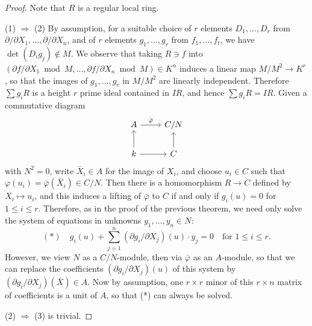 \begin{proof}
Note that $R$ is a regular local ring.

(1) $\Rightarrow$ (2) By assumption, for a suitable choice of $r$ elements
$D_1, \ldots, D_r$ from $\partial/\partial X_1, \ldots, \partial/\partial X_n$, and of $r$ elements
$g_1, \ldots, g_r$ from $f_1, \ldots, f_t$, we have $\det(D_ig_j) \notin M$. We observe that
taking $R \ni f$ into $(\partial f/\partial X_1 \bmod M, \ldots, \partial f/\partial X_n \bmod M)
\in K^n$ induces a linear map $M/M^2 \to K^r$, so that the images of $g_1, \ldots, g_r$ in
$M/M^2$ are linearly independent. Therefore $\sum g_iR$ is a height $r$ prime ideal
contained in $IR$, and hence $\sum g_iR = IR$. Given a commutative diagram
\[
\begin{tikzcd}
A \arrow[r, "\bar{\varphi}"] & C/N \\
k \arrow[u] \arrow[r] & C \arrow[u]
\end{tikzcd}
\]
with $N^2 = 0$, write $\bar{X}_i \in A$ for the image of $X_i$, and choose $u_i \in C$
such that $\varphi(u_i) = \bar{\varphi}(\bar{X}_i) \in C/N$. Then there is a homomorphism
$R \to C$ defined by $X_i \mapsto u_i$, and this induces a lifting of $\bar{\varphi}$ to $C$ if and
only if $g_i(u) = 0$ for $1 \le i \le r$. Therefore, as in the proof of the previous
theorem, we need only solve the system of equations in unknowns
$y_1, \ldots, y_n \in N$:
\[
  (*) \quad g_i(u) + \sum_{j=1}^{n} (\partial g_i/\partial X_j)(u) \cdot y_j = 0
      \quad \text{for } 1 \le i \le r.
\]
However, we view $N$ as a $C/N$-module, then via $\bar{\varphi}$ as an $A$-module, so that we
can replace the coefficients $(\partial g_i/\partial X_j)(u)$ of this system by
$(\partial g_i/\partial X_j)(\bar{X}) \in A$. Now by assumption, one $r \times r$ minor of this
$r \times n$ matrix of coefficients is a unit of $A$, so that (*) can always be solved.

(2) $\Rightarrow$ (3) is trivial.


\end{proof}
